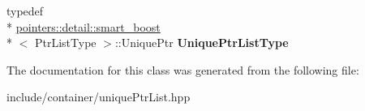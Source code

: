 \begin{DoxyCompactItemize}
\item 
\hypertarget{classcore_1_1container_1_1_unique_ptr_list_ab47ecafa25c08d2654d11e03b1163026}{typedef \\*
\hyperlink{structcore_1_1pointers_1_1detail_1_1smart__boost}{pointers\-::detail\-::smart\-\_\-boost}\\*
$<$ Ptr\-List\-Type $>$\-::Unique\-Ptr {\bfseries Unique\-Ptr\-List\-Type}}\label{classcore_1_1container_1_1_unique_ptr_list_ab47ecafa25c08d2654d11e03b1163026}

\end{DoxyCompactItemize}


The documentation for this class was generated from the following file\-:\begin{DoxyCompactItemize}
\item 
include/container/unique\-Ptr\-List.\-hpp\end{DoxyCompactItemize}

